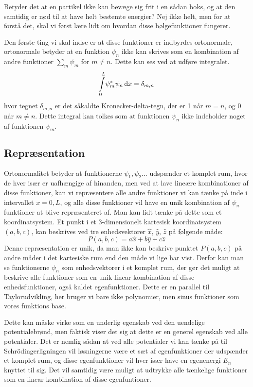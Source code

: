 \documentclass[../Kvantemekanik.tex]{subfiles}
\begin{document}
Betyder det at en partikel ikke kan bevæge sig frit i en sådan boks, og at den samtidig er nød til at have helt bestemte energier? Nej ikke helt, men for at forstå det, skal vi først lære lidt om hvordan disse bølgefunktioner fungerer.

Den første ting vi skal indse er at disse funktioner er indbyrdes ortonormale, ortonormale betyder at en funktion $\psi_n$ ikke kan skrives som en kombination af andre funktioner $\sum_m \psi_m$ for $m\neq n$. Dette kan ses ved at udføre integralet.
\begin{equation*}
    \integral{\psi_m^*\psi_n}{x}{0}{L} = \delta_{m,n}
\end{equation*}
hvor tegnet $\delta_{m,n}$ er det såkaldte Kronecker-delta-tegn, der er 1 når $m=n$, og 0 når $m\neq n$. Dette integral kan tolkes som at funktionen $\psi_n$ ikke indeholder noget af funktionen $\psi_m$.

\subsection{Repræsentation}
Ortonormalitet betyder at funktionerne $\psi_1, \psi_2...$ udspænder et komplet rum, hvor de hver især er uafhængige af hinanden, men ved at lave lineære kombinationer af disse funktioner, kan vi repræsentere alle andre funktioner vi kan tænke på inde i intervallet $x=0,L$, og alle disse funktioner vil have en unik kombination af $\psi_n$ funktioner at blive repræsenteret af. Man kan lidt tænke på dette som et koordinatsystem. Et punkt i et 3-dimensionelt kartesisk koordinatsystem $(a,b,c)$, kan beskrives ved tre enhedsvektorer $\hat{x}$, $\hat{y}$, $\hat{z}$ på følgende måde:
\begin{equation*}
    P(a,b,c)=a\hat{x}+b\hat{y}+c\hat{z}
\end{equation*}
Denne repræsentation er unik, da man ikke kan beskrive punktet $P(a,b,c)$ på andre måder i det kartesiske rum end den måde vi lige har vist. Derfor kan man se funktionerne $\psi_n$ som enhedsvektorer i et komplet rum, der gør det muligt at beskrive alle funktioner som en unik linear kombination af disse enhedsfunktioner, også kaldet egenfunktioner. Dette er en parallel til Taylorudvikling, her bruger vi bare ikke polynomier, men sinus funktioner som vores funktions base.

Dette kan måske virke som en underlig egenskab ved den uendelige potentialebrønd, men faktisk viser det sig at dette er en generel egenskab ved alle potentialer. Det er nemlig sådan at ved alle potentialer vi kan tænke på til Schrödingerligningen vil løsningerne være et sæt af egenfunktioner der udspænder et komplet rum, og disse egenfunktioner vil hver især have en egenenergi $E_n$ knyttet til sig. Det vil samtidig være muligt at udtrykke alle tænkelige funktioner som en linear kombination af disse egenfuntioner. 
\end{document}

